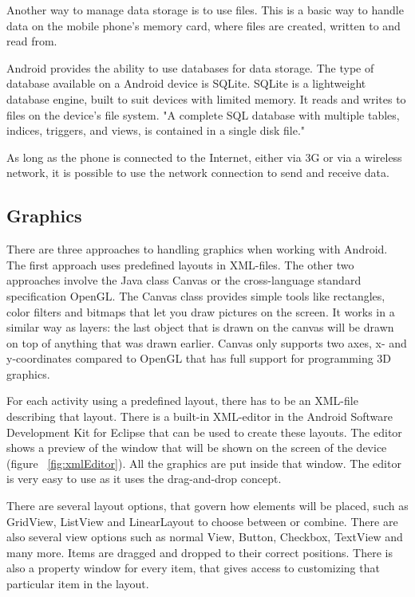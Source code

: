 Another way to manage data storage is to use files. This is a basic way to handle data on the mobile phone's memory card, where files are created, written to and read from. \citep{Android} 

Android provides the ability to use databases for data storage. The type of database available on a Android device is SQLite. \citep{Android} SQLite is a lightweight database engine, built to suit devices with limited memory. It reads and writes to files on the device's file system. "A complete SQL database with multiple tables, indices, triggers, and views, is contained in a single disk file." \citep{SQLite}

As long as the phone is connected to the Internet, either via 3G or via a wireless network, it is possible to use the network connection to send and receive data. \citep{Android}
\subsection{Graphics}

There are three approaches to handling graphics when working with Android. The first approach uses predefined layouts in XML-files. The other two approaches involve the Java class Canvas or the cross-language standard specification OpenGL. The Canvas class provides simple tools like rectangles, color filters and bitmaps that let you draw pictures on the screen. It works in a similar way as layers: the last object that is drawn on the canvas will be drawn on top of anything that was drawn earlier. Canvas only supports two axes, x- and y-coordinates compared to OpenGL that has full support for programming 3D graphics.

For each activity using a predefined layout, there has to be an XML-file describing that layout. There is a built-in XML-editor in the Android Software Development Kit for Eclipse that can be used to create these layouts. The editor shows a preview of the window that will be shown on the screen of the device (figure ~\ref{fig:xmlEditor}). All the graphics are put inside that window. The editor is very easy to use as it uses the drag-and-drop concept. 

There are several layout options, that govern how elements will be placed, such as GridView, ListView and LinearLayout to choose between or combine. There are also several view options such as normal View, Button, Checkbox, TextView and many more. Items are dragged and dropped to their correct positions. There is also a property window for every item, that gives access to customizing that particular item in the layout.

